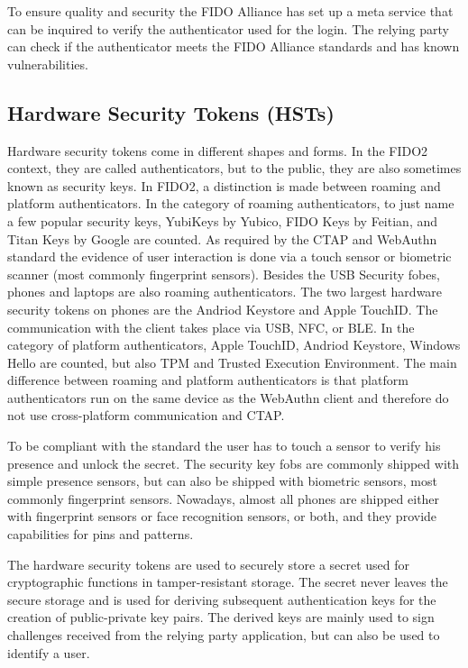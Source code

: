 \documentclass[runningheads]{llncs}
\begin{document}
To ensure quality and security the FIDO Alliance has set up a meta service that can be inquired to verify the authenticator used for the login. The relying party can check if the authenticator meets the FIDO Alliance standards and has known vulnerabilities.\cite{9099190}

\subsection{Hardware Security Tokens (HSTs)}
Hardware security tokens come in different shapes and forms. In the FIDO2 context, they are called authenticators, but to the public, they are also sometimes known as security keys. In FIDO2, a distinction is made between roaming and platform authenticators. In the category of roaming authenticators, to just name a few popular security keys, YubiKeys by Yubico, FIDO Keys by Feitian, and Titan Keys by Google are counted. As required by the CTAP and WebAuthn standard the evidence of user interaction is done via a touch sensor or biometric scanner (most commonly fingerprint sensors). Besides the USB Security fobes, phones and laptops are also roaming authenticators. The two largest hardware security tokens on phones are the Andriod Keystore and Apple TouchID. The communication with the client takes place via USB, NFC, or BLE.
In the category of platform authenticators, Apple TouchID, Andriod Keystore, Windows Hello are counted, but also TPM and Trusted Execution Environment. The main difference between roaming and platform authenticators is that platform authenticators run on the same device as the WebAuthn client and therefore do not use cross-platform communication and CTAP. \cite{9152694}

To be compliant with the standard the user has to touch a sensor to verify his presence and unlock the secret. The security key fobs are commonly shipped with simple presence sensors, but can also be shipped with biometric sensors, most commonly fingerprint sensors. Nowadays, almost all phones are shipped either with fingerprint sensors or face recognition sensors, or both, and they provide capabilities for pins and patterns.

The hardware security tokens are used to securely store a secret used for cryptographic functions in tamper-resistant storage. The secret never leaves the secure storage and is used for deriving subsequent authentication keys for the creation of public-private key pairs. The derived keys are mainly used to sign challenges received from the relying party application, but can also be used to identify a user.\cite{272198}
\end{document}
